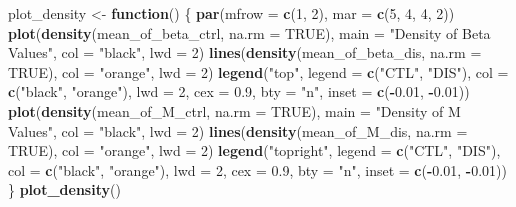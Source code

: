 \documentclass[
  11pt,
]{article}
\newenvironment{Shaded}{\begin{snugshade}}{\end{snugshade}}
\newcommand{\AttributeTok}[1]{\textcolor[rgb]{0.13,0.29,0.53}{#1}}
\newcommand{\ConstantTok}[1]{\textcolor[rgb]{0.56,0.35,0.01}{#1}}
\newcommand{\ControlFlowTok}[1]{\textcolor[rgb]{0.13,0.29,0.53}{\textbf{#1}}}
\newcommand{\DecValTok}[1]{\textcolor[rgb]{0.00,0.00,0.81}{#1}}
\newcommand{\FloatTok}[1]{\textcolor[rgb]{0.00,0.00,0.81}{#1}}
\newcommand{\FunctionTok}[1]{\textcolor[rgb]{0.13,0.29,0.53}{\textbf{#1}}}
\newcommand{\NormalTok}[1]{#1}
\newcommand{\OtherTok}[1]{\textcolor[rgb]{0.56,0.35,0.01}{#1}}
\newcommand{\SpecialCharTok}[1]{\textcolor[rgb]{0.81,0.36,0.00}{\textbf{#1}}}
\newcommand{\StringTok}[1]{\textcolor[rgb]{0.31,0.60,0.02}{#1}}
\begin{document}
\begin{Shaded}
\begin{Highlighting}[]
\NormalTok{plot\_density }\OtherTok{\textless{}{-}} \ControlFlowTok{function}\NormalTok{() \{}
  \FunctionTok{par}\NormalTok{(}\AttributeTok{mfrow =} \FunctionTok{c}\NormalTok{(}\DecValTok{1}\NormalTok{, }\DecValTok{2}\NormalTok{), }\AttributeTok{mar =} \FunctionTok{c}\NormalTok{(}\DecValTok{5}\NormalTok{, }\DecValTok{4}\NormalTok{, }\DecValTok{4}\NormalTok{, }\DecValTok{2}\NormalTok{))  }
  \FunctionTok{plot}\NormalTok{(}\FunctionTok{density}\NormalTok{(mean\_of\_beta\_ctrl, }\AttributeTok{na.rm =} \ConstantTok{TRUE}\NormalTok{), }\AttributeTok{main =} \StringTok{"Density of Beta Values"}\NormalTok{,}
       \AttributeTok{col =} \StringTok{"black"}\NormalTok{, }\AttributeTok{lwd =} \DecValTok{2}\NormalTok{)}
  \FunctionTok{lines}\NormalTok{(}\FunctionTok{density}\NormalTok{(mean\_of\_beta\_dis, }\AttributeTok{na.rm =} \ConstantTok{TRUE}\NormalTok{), }\AttributeTok{col =} \StringTok{"orange"}\NormalTok{, }\AttributeTok{lwd =} \DecValTok{2}\NormalTok{)}
  \FunctionTok{legend}\NormalTok{(}\StringTok{"top"}\NormalTok{, }\AttributeTok{legend =} \FunctionTok{c}\NormalTok{(}\StringTok{"CTL"}\NormalTok{, }\StringTok{"DIS"}\NormalTok{),}
         \AttributeTok{col =} \FunctionTok{c}\NormalTok{(}\StringTok{"black"}\NormalTok{, }\StringTok{"orange"}\NormalTok{), }\AttributeTok{lwd =} \DecValTok{2}\NormalTok{,}
         \AttributeTok{cex =} \FloatTok{0.9}\NormalTok{, }\AttributeTok{bty =} \StringTok{"n"}\NormalTok{, }\AttributeTok{inset =} \FunctionTok{c}\NormalTok{(}\SpecialCharTok{{-}}\FloatTok{0.01}\NormalTok{, }\SpecialCharTok{{-}}\FloatTok{0.01}\NormalTok{))}
  \FunctionTok{plot}\NormalTok{(}\FunctionTok{density}\NormalTok{(mean\_of\_M\_ctrl, }\AttributeTok{na.rm =} \ConstantTok{TRUE}\NormalTok{), }\AttributeTok{main =} \StringTok{"Density of M Values"}\NormalTok{, }\AttributeTok{col =} \StringTok{"black"}\NormalTok{, }\AttributeTok{lwd =} \DecValTok{2}\NormalTok{)}
  \FunctionTok{lines}\NormalTok{(}\FunctionTok{density}\NormalTok{(mean\_of\_M\_dis, }\AttributeTok{na.rm =} \ConstantTok{TRUE}\NormalTok{), }\AttributeTok{col =} \StringTok{"orange"}\NormalTok{, }\AttributeTok{lwd =} \DecValTok{2}\NormalTok{)}
  \FunctionTok{legend}\NormalTok{(}\StringTok{"topright"}\NormalTok{, }\AttributeTok{legend =} \FunctionTok{c}\NormalTok{(}\StringTok{"CTL"}\NormalTok{, }\StringTok{"DIS"}\NormalTok{),}
         \AttributeTok{col =} \FunctionTok{c}\NormalTok{(}\StringTok{"black"}\NormalTok{, }\StringTok{"orange"}\NormalTok{), }\AttributeTok{lwd =} \DecValTok{2}\NormalTok{,}
         \AttributeTok{cex =} \FloatTok{0.9}\NormalTok{, }\AttributeTok{bty =} \StringTok{"n"}\NormalTok{, }\AttributeTok{inset =} \FunctionTok{c}\NormalTok{(}\SpecialCharTok{{-}}\FloatTok{0.01}\NormalTok{, }\SpecialCharTok{{-}}\FloatTok{0.01}\NormalTok{))}
\NormalTok{\}}
\FunctionTok{plot\_density}\NormalTok{()}
\end{Highlighting}
\end{Shaded}
\end{document}
